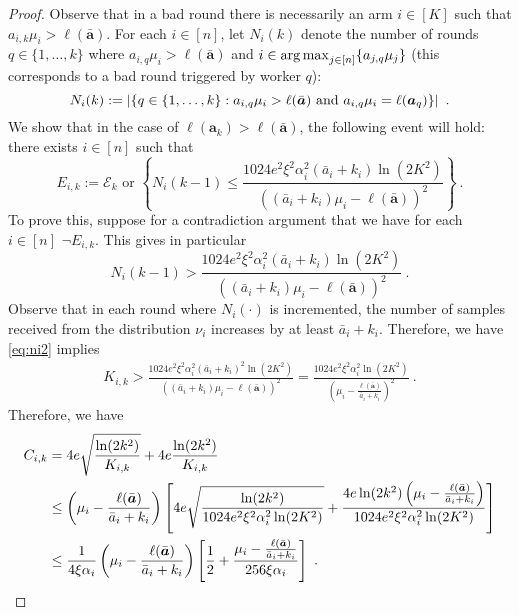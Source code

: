 \begin{proof}
	\noindent Observe that in a bad round there is necessarily an arm $i \in [K]$ such that $a_{i,k} \mu_i > \ell(\bar{\bm{a}})$. For each $i\in [n]$, let $N_i(k)$ denote the number of rounds $q\in \{1,\dots, k\}$ where $a_{i,q} \mu_i > \ell(\bar{\bm{a}})$ and $i \in \operatorname*{arg\,max}_{j \in [n]} \{ a_{j,q} \mu_j\}$ (this corresponds to a bad round triggered by worker $q$):
	$$
	N_i(k) := \left| \left\lbrace q \in \{1, \dots, k\}: a_{i,q}\mu_i > \ell(\bar{\bm{a}}) \text{ and } a_{i,q}\mu_i = \ell(\bm{a}_q) \right\rbrace \right|~.
	$$
	We show that in the case of $\ell(\bm{a}_k) > \ell(\bar{\bm{a}})$, the following event will hold: there exists $i \in [n]$ such that 
	$$
	E_{i,k} := \mathcal{E}_k \text{ or }\left\lbrace N_i(k-1) \le  \frac{1024e^2 \xi^2\alpha_i^2 (\bar{a}_i+k_i) \ln(2K^2)}{\left((\bar{a}_i+k_i)\mu_i - \ell(\bar{\bm{a}})\right)^2}  \right\rbrace~.
	$$
	To prove this, suppose for a contradiction argument that we have for each $i \in [n]$ $\neg E_{i,k}$. This gives in particular
	\begin{equation}\label{eq:ni2}
		N_i(k-1) >  \frac{1024e^2 \xi^2\alpha_i^2 (\bar{a}_i+k_i) \ln(2K^2)}{\left((\bar{a}_i+k_i)\mu_i - \ell(\bar{\bm{a}})\right)^2}~.
	\end{equation}
	Observe that in each round where $N_i(\cdot)$ is incremented, the number of samples received from the distribution $\nu_i$ increases by at least $\bar{a}_{i}+k_i$. 
	Therefore, we have \eqref{eq:ni2} implies
	\begin{align*}
		K_{i,k}
		>  \frac{1024e^2 \xi^2\alpha_i^2 (\bar{a}_i+k_i)^2 \ln(2K^2)}{\left((\bar{a}_i+k_i)\mu_i - \ell(\bar{\bm{a}})\right)^2}
		=  \frac{1024e^2 \xi^2\alpha_i^2  \ln(2K^2)}{\left(\mu_i - \frac{\ell(\bar{\bm{a}})}{\bar{a}_i+k_i}\right)^2}~.
	\end{align*}
	Therefore, we have
	\begin{align*}
		C_{i,k} &= 4e \sqrt{\frac{\ln(2k^2)}{K_{i,k}}}+4e \frac{\ln(2k^2)}{K_{i,k}}\\
		&\le \left(\mu_i - \frac{\ell(\bar{\ba})}{\bar{a}_i+k_i}\right) \left[4e \sqrt{\frac{\ln(2k^2)}{1024e^2 \xi^2 \alpha_i^2 \ln(2K^2)}}+ \frac{4e \ln(2k^2)\left(\mu_i - \frac{\ell(\bar{\ba})}{\bar{a}_i+k_i}\right)}{1024e^2\xi^2\alpha_i^2 \ln(2K^2)} \right]  \\
		&\le \frac{1}{4\xi \alpha_i} \left(\mu_i - \frac{\ell(\bar{\ba})}{\bar{a}_i+k_i}\right) \left[ \frac{1}{2}+ \frac{\mu_i - \frac{\ell(\bar{\ba})}{\bar{a}_i+k_i}}{256\xi \alpha_i}\right]~.

\end{align*}
\end{proof}
